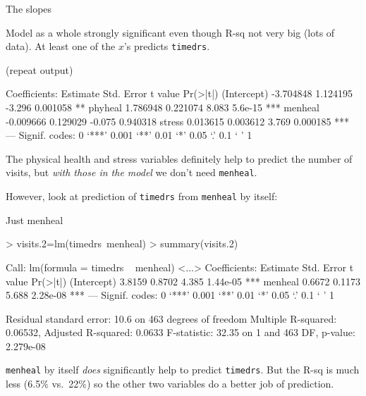 \begin{frame}[fragile]{The slopes}

Model as a whole strongly significant even though R-sq not very big (lots of data). At least one of the $x$'s predicts \verb-timedrs-.

(repeat output)

{\scriptsize
\begin{semiverbatim}
Coefficients:
             Estimate Std. Error t value Pr(>|t|)    
(Intercept) -3.704848   1.124195  -3.296 0.001058 ** 
phyheal      1.786948   0.221074   8.083  5.6e-15 ***
menheal     -0.009666   0.129029  -0.075 0.940318    
stress       0.013615   0.003612   3.769 0.000185 ***
---
Signif. codes:  0 ‘***’ 0.001 ‘**’ 0.01 ‘*’ 0.05 ‘.’ 0.1 ‘ ’ 1 

\end{semiverbatim}
}

The physical health and stress variables definitely help to predict the number of visits, but {\em with those in the model} we don't need \verb-menheal-.


However, look at prediction of \verb-timedrs- from \verb-menheal- by itself:
  
\end{frame}

\begin{frame}[fragile]{Just menheal}

{\scriptsize
\begin{semiverbatim}
> visits.2=lm(timedrs~menheal)
> summary(visits.2)

Call:
lm(formula = timedrs ~ menheal)
<...>
Coefficients:
            Estimate Std. Error t value Pr(>|t|)    
(Intercept)   3.8159     0.8702   4.385 1.44e-05 ***
menheal       0.6672     0.1173   5.688 2.28e-08 ***
---
Signif. codes:  0 ‘***’ 0.001 ‘**’ 0.01 ‘*’ 0.05 ‘.’ 0.1 ‘ ’ 1 

Residual standard error: 10.6 on 463 degrees of freedom
Multiple R-squared: 0.06532,	Adjusted R-squared: 0.0633 
F-statistic: 32.35 on 1 and 463 DF,  p-value: 2.279e-08 

\end{semiverbatim}
}

\verb-menheal- by itself {\em does} significantly help to predict \verb-timedrs-. But the R-sq is much less (6.5\% vs.\ 22\%) so the other two variables do a better job of prediction. 


\end{frame}

